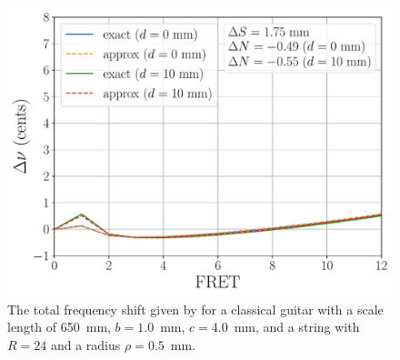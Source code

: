   \begin{figure}
    \centering
    \includegraphics[width=5.0in]{../figures/comp_est}
    \caption{\label{fig:comp_est} The total frequency shift given by  for a classical guitar with a scale length of 650~mm, $b = 1.0$~mm, $c = 4.0$~mm, and a string with $R = 24$ and a radius $\rho = 0.5$~mm.}
  \end{figure}



